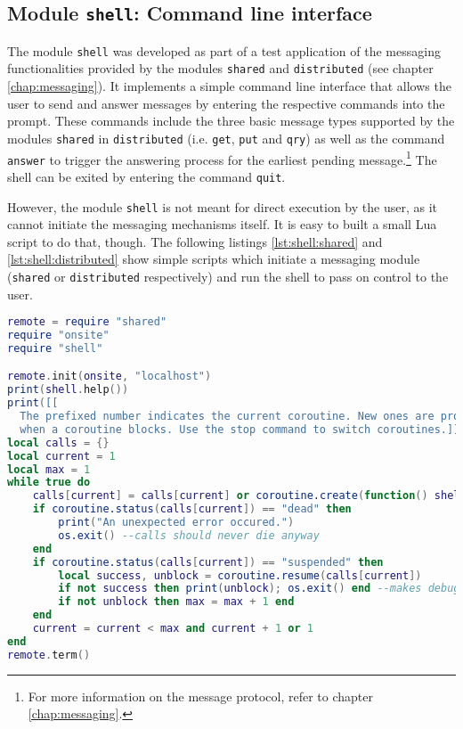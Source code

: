 \begin{appendices}
\section{Module \texttt{shell}: Command line interface}
\label{shell}

The module \texttt{shell} was developed as part of a test application of the messaging functionalities provided by the modules \texttt{shared} and \texttt{distributed} (see chapter \ref{chap:messaging}). It implements a simple command line interface that allows the user to send and answer messages by entering the respective commands into the prompt. These commands include the three basic message types supported by the modules \texttt{shared} in \texttt{distributed} (i.e. \texttt{get}, \texttt{put} and \texttt{qry}) as well as the command \texttt{answer} to trigger the answering process for the earliest pending message.\footnote{For more information on the message protocol, refer to chapter \ref{chap:messaging}.} The shell can be exited by entering the command \texttt{quit}.

However, the module \texttt{shell} is not meant for direct execution by the user, as it cannot initiate the messaging mechanisms itself. It is easy to built a small Lua script to do that, though. The following listings \ref{lst:shell:shared} and \ref{lst:shell:distributed} show simple scripts which initiate a messaging module (\texttt{shared} or \texttt{distributed} respectively) and run the shell to pass on control to the user.

\begin{lstlisting}[language=lua, caption={A script starting \texttt{shared} messaging and running a \texttt{shell}}, label=lst:shell:shared, name=lst:shell:shared]
remote = require "shared"
require "onsite"
require "shell"

remote.init(onsite, "localhost")
print(shell.help())
print([[
  The prefixed number indicates the current coroutine. New ones are produced on the fly
  when a coroutine blocks. Use the stop command to switch coroutines.]])
local calls = {}
local current = 1
local max = 1
while true do
	calls[current] = calls[current] or coroutine.create(function() shell.run("localhost", tostring(current)) end)
	if coroutine.status(calls[current]) == "dead" then
		print("An unexpected error occured.")
		os.exit() --calls should never die anyway
	end
	if coroutine.status(calls[current]) == "suspended" then
		local success, unblock = coroutine.resume(calls[current])
		if not success then print(unblock); os.exit() end --makes debugging easier
		if not unblock then max = max + 1 end
	end
	current = current < max and current + 1 or 1
end
remote.term()
\end{lstlisting}


\end{appendices}
